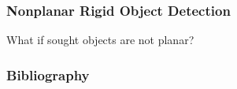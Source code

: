 \documentclass[xetex,professionalfont]{beamer}
\let\oldemph\emph
\renewcommand\emph[1]{\textcolor{tuwcvl_inf_red}{#1}}
\begin{document}

\begin{frame}
\frametitle{Nonplanar Rigid Object Detection}

What if sought objects are not planar?

\end{frame}


\renewcommand\emph[1]{\oldemph{#1}}

\begin{frame}
\frametitle{Bibliography}

\printbibliography

\end{frame}
\end{document}
